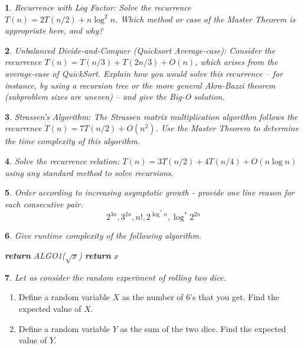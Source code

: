 \documentclass[%
addpoints]{exam}
\theoremstyle{problem}
\newtheorem{p}{}
\begin{document}
\begin{p}
Recurrence with Log Factor: Solve the recurrence \(T(n) = 2T(n/2) + n \log^2 n\). Which method or case of the Master Theorem is appropriate here, and why?  
\hfill\end{p}

\begin{p}
Unbalanced Divide-and-Conquer (Quicksort Average-case): Consider the recurrence \(T(n) = T(n/3) + T(2n/3) + O(n)\), which arises from the average-case of QuickSort. Explain how you would solve this recurrence – for instance, by using a recursion tree or the more general Akra-Bazzi theorem (subproblem sizes are uneven) – and give the Big-O solution.  
\hfill\end{p}

\begin{p}
Strassen's Algorithm: The Strassen matrix multiplication algorithm follows the recurrence \(T(n) = 7T(n/2) + O(n^2)\). Use the Master Theorem to determine the time complexity of this algorithm.  
\hfill\end{p}

\begin{p}
Solve the recurrence relation: \( T(n) = 3T(n/2) + 4T(n/4) + O(n \log n) \) using any standard method to solve recursions.
\hfill\end{p}

\begin{p}
Order according to increasing asymptotic growth - provide one line reason for each consecutive pair.
\[
2^{3n},3^{2n},n!,2^{\log^*n},\log^* 2^{2n}
\]
\hfill \end{p}

\begin{p}
Give runtime complexity of the following algorithm.
\begin{algorithm}[!ht]
	\label{algo1}
	\begin{algorithmic}
		 
		\State \textbf{return} ALGO1($\sqrt{x}$)
		\Else
		\State \textbf{return} $x$
		\EndIf
		\EndProcedure
	\end{algorithmic}
\end{algorithm}
\hfill \end{p}



\begin{p}
Let us consider the random experiment of rolling two dice.
\hfill \end{p}
\begin{enumerate}
    \item Define a random variable \(X\) as the number of 6's that you get. Find the expected value of \(X\).
    \item Define a random variable \(Y\) as the sum of the two dice. Find the expected value of \(Y\).
\end{enumerate}
\end{document}
